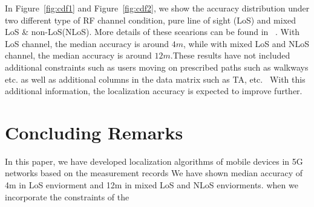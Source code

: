 \documentclass[conference, 10pt]{IEEEtran}
\begin{document}
In Figure~\ref{fig:cdf1} and Figure~\ref{fig:cdf2}, we show the
accuracy distribution under two different type of RF channel condition, pure line of sight (LoS) and mixed LoS \& non-LoS(NLoS). More details of these scearions can be found in 
~\cite{3gpp38901}. With LoS channel, the median accuracy is around
$4m$, while with mixed LoS and NLoS channel, the median accuracy is around $12m$.These results have not included additional constraints such as users moving on prescribed paths such as walkways etc. as well as additional columns in the data matrix such as TA, etc. 
With this additional information, the localization accuracy is expected to improve further.

\section{Concluding Remarks}
\label{sec:concl}

In this paper, we have developed localization algorithms of mobile devices in 5G networks based on the measurement records 
We have shown median accuracy of 4m in LoS enviorment and 12m in mixed LoS and NLoS enviorments. 
when we incorporate the constraints of the 




%
%    

{%


}
\end{document}
